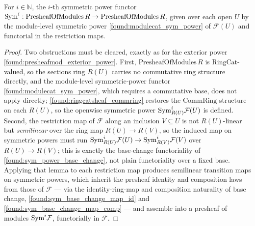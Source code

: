 \begin{lemma}\leanok
  \label{found:presheafmod_sym_power}
  For \(i\in\mathbb N\), the \(i\)-th symmetric power functor
  \(\mathrm{Sym}^i:\mathrm{PresheafOfModules}\,R\to\mathrm{PresheafOfModules}\,R\), given
  over each open \(U\) by the module-level symmetric power
  \cref{found:modulecat_sym_power} of \(\mathcal F(U)\) and functorial in the
  restriction maps.
\end{lemma}

\begin{proof}\leanok
  Two obstructions must be cleared, exactly as for the exterior power
  \cref{found:presheafmod_exterior_power}.  First,
  \(\mathrm{PresheafOfModules}\,R\) is \(\mathrm{RingCat}\)-valued, so the sections
  ring \(R(U)\) carries no commutative ring structure directly, and the
  module-level symmetric-power functor \cref{found:modulecat_sym_power}, which
  requires a commutative base, does not apply directly;
  \cref{found:ringcatsheaf_commring} restores the \(\mathrm{CommRing}\) structure
  on each \(R(U)\), so the openwise symmetric power \(\mathrm{Sym}^i_{R(U)}\mathcal F(U)\)
  is defined.  Second, the restriction map of \(\mathcal F\) along an inclusion
  \(V\subseteq U\) is not \(R(U)\)-linear but \emph{semilinear} over the ring map
  \(R(U)\to R(V)\), so the induced map on symmetric powers must run
  \(\mathrm{Sym}^i_{R(U)}\mathcal F(U)\to\mathrm{Sym}^i_{R(V)}\mathcal F(V)\) over
  \(R(U)\to R(V)\); this is exactly the base-change functoriality of
  \cref{found:sym_power_base_change}, not plain functoriality over a fixed base.
  Applying that lemma to each restriction map produces semilinear transition maps
  on symmetric powers, which inherit the presheaf identity and composition laws
  from those of \(\mathcal F\) --- via the identity-ring-map and composition
  naturality of base change, \cref{found:sym_base_change_map_id} and
  \cref{found:sym_base_change_map_comp} --- and assemble into a presheaf of modules
  \(\mathrm{Sym}^i\mathcal F\), functorially in \(\mathcal F\).
\end{proof}

